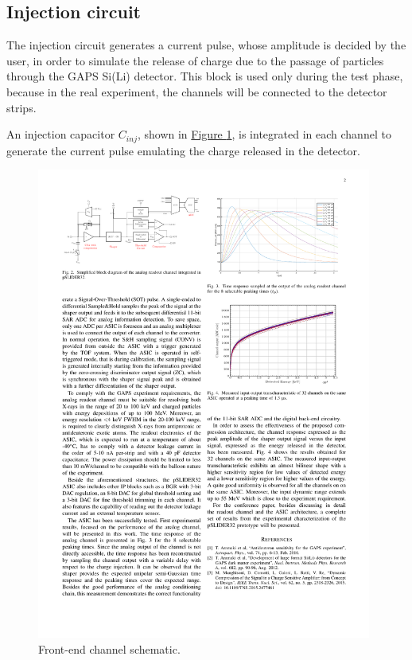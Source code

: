 
\subsection*{Injection circuit}
The injection circuit generates a current pulse, whose amplitude is decided by the user, in order to simulate the release of charge due to the passage of particles through the GAPS Si(Li) detector. This block is used only during the test phase, because in the real experiment, the channels will be connected to the detector strips. 

\par
An injection capacitor $C_{inj}$, shown in \hyperref[figGAPSchannel]{Figure \ref{figGAPSchannel}}, is integrated in each channel to generate the current pulse emulating the charge released in the detector.

\begin{figure}[h!]
    \centering
    \includegraphics[width=0.98\textwidth]{Images/appendGAPSintro/readoutchannelADC.pdf}
    \caption{Front-end channel schematic.}
    \label{figGAPSchannel}
\end{figure}

